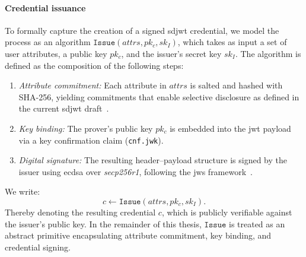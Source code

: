 \paragraph{Credential issuance}
To formally capture the creation of a signed \acrshort{sdjwt} credential, we model the process as an algorithm \(\texttt{Issue}(attrs, pk_c, sk_I)\), which takes as input a set of user attributes, a public key $pk_c$, and the issuer’s secret key $sk_I$. The algorithm is defined as the composition of the following steps:
\begin{enumerate}
	\item \textit{Attribute commitment:} Each attribute in $attrs$ is salted and hashed with SHA-256, yielding commitments that enable selective disclosure as defined in the current \acrshort{sdjwt} draft~\cite{IETF-SDJWT-07}.
	\item \textit{Key binding:} The prover’s public key $pk_c$ is embedded into the \acrshort{jwt} payload via a key confirmation claim (\texttt{cnf.jwk}).
	\item \textit{Digital signature:} The resulting header–payload structure is signed by the issuer using \acrshort{ecdsa} over \emph{secp256r1}, following the \acrfull{jws} framework~\cite{RFC7515}.
\end{enumerate}
We write:
\[
c \leftarrow \texttt{Issue}(attrs, pk_c, sk_I).
\]
Thereby denoting the resulting credential $c$, which is publicly verifiable against the issuer’s public key. In the remainder of this thesis, \(\texttt{Issue}\) is treated as an abstract primitive encapsulating attribute commitment, key binding, and credential signing.
